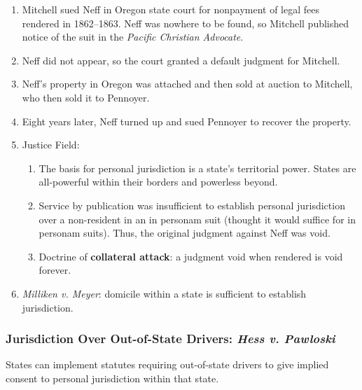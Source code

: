 \begin{enumerate}
    \item Mitchell sued Neff in Oregon state court for nonpayment of legal 
    fees rendered in 1862--1863. Neff was nowhere to be found, so Mitchell 
    published notice of the suit in the \emph{Pacific Christian Advocate}.
    \item Neff did not appear, so the court granted a default judgment for 
    Mitchell.
    \item Neff's property in Oregon was attached and then sold at auction to 
    Mitchell, who then sold it to Pennoyer.
    \item Eight years later, Neff turned up and sued Pennoyer to recover the 
    property.
    \item Justice Field:
    \begin{enumerate}
        \item The basis for personal jurisdiction is a state's territorial 
        power. States are all-powerful within their borders and powerless 
        beyond.
        \item Service by publication was insufficient to establish personal 
        jurisdiction over a non-resident in an in personam suit (thought it 
        would suffice for in personam suits). Thus, the original judgment 
        against Neff was void.
        \item Doctrine of \textbf{collateral attack}: a judgment void when 
        rendered is void forever.
    \end{enumerate}
    \item \emph{Milliken v. Meyer}: domicile within a state is sufficient to 
    establish jurisdiction.
\end{enumerate}

\subsubsection{Jurisdiction Over Out-of-State Drivers: \emph{Hess v. 
Pawloski}}

States can implement statutes requiring out-of-state drivers to give implied 
consent to personal jurisdiction within that state.

